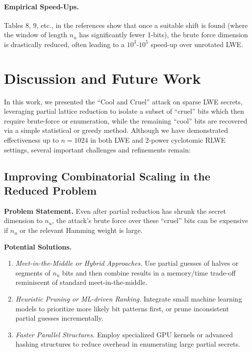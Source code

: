 \documentclass[11pt]{article}
\begin{document}
\paragraph{Empirical Speed-Ups.}
Tables 8, 9, etc., in the references show that once a suitable shift is found (where the window of length $n_u$ has significantly fewer 1-bits), the brute force dimension is drastically reduced, often leading to a $10^3\text{-}10^5$ speed-up over unrotated LWE.


\section{Discussion and Future Work}
\label{sec:discussion}

In this work, we presented the “Cool and Cruel” attack on sparse LWE secrets, leveraging partial lattice reduction to isolate a subset of “cruel” bits which then require brute-force or enumeration, while the remaining “cool” bits are recovered via a simple statistical or greedy method. Although we have demonstrated effectiveness up to $n=1024$ in both LWE and 2-power cyclotomic RLWE settings, several important challenges and refinements remain:

\subsection{Improving Combinatorial Scaling in the Reduced Problem}

\noindent \textbf{Problem Statement.}
Even after partial reduction has shrunk the secret dimension to $n_u$, the attack’s brute force over these “cruel” bits can be expensive if $n_u$ or the relevant Hamming weight is large.

\noindent \textbf{Potential Solutions.}
\begin{enumerate}
\item \emph{Meet-in-the-Middle or Hybrid Approaches.} Use partial guesses of halves or segments of $n_u$ bits and then combine results in a memory/time trade-off reminiscent of standard meet-in-the-middle. 
\item \emph{Heuristic Pruning or ML-driven Ranking.} Integrate small machine learning models to prioritize more likely bit patterns first, or prune inconsistent partial guesses incrementally.
\item \emph{Faster Parallel Structures.} Employ specialized GPU kernels or advanced hashing structures to reduce overhead in enumerating large partial secrets.
\end{enumerate}
\end{document}
